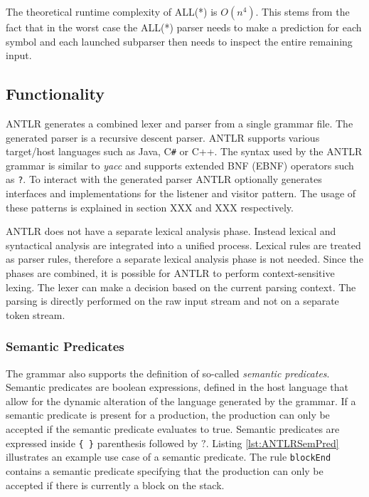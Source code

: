 The theoretical runtime complexity of ALL(*) is $O(n^4)$. This stems from the fact that in the worst case the ALL(*) parser needs to make a prediction for each symbol and each launched subparser then needs to inspect the entire remaining input. 


\subsection{Functionality}

ANTLR generates a combined lexer and parser from a single grammar file. The generated parser is a recursive descent parser. ANTLR supports various target/host languages such as Java, C\verb|#| or C++. The syntax used by the ANTLR grammar is similar to \textit{yacc} and supports extended BNF (EBNF) operators such as \texttt{?}. To interact with the generated parser ANTLR optionally generates interfaces and implementations for the listener and visitor pattern. The usage of these patterns is explained in section XXX and XXX respectively.

ANTLR does not have a separate lexical analysis phase. Instead lexical and syntactical analysis are integrated into a unified process. Lexical rules are treated as parser rules, therefore a separate lexical analysis phase is not needed. Since the phases are combined, it is possible for ANTLR to perform context-sensitive lexing. The lexer can make a decision based on the current parsing context. The parsing is directly performed on the raw input stream and not on a separate token stream. 

\subsubsection{Semantic Predicates}

The grammar also supports the definition of so-called \textit{semantic predicates}. Semantic predicates are boolean expressions, defined in the host language that allow for the dynamic alteration of the language generated by the grammar. If a semantic predicate is present for a production, the production can only be accepted if the semantic predicate evaluates to true. Semantic predicates are expressed inside \verb|{ }| parenthesis followed by $?$. Listing \ref{lst:ANTLRSemPred} illustrates an example use case of a semantic predicate. The rule \texttt{blockEnd} contains a semantic predicate specifying that the production can only be accepted if there is currently a block on the stack. 

